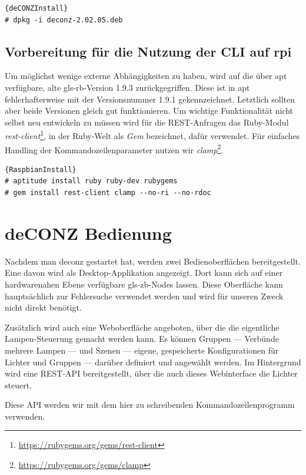\documentclass[a4paper,12pt]{article}
\begin{document}
\begin{lstlisting}[caption=deCONZ installieren]{deCONZInstall}
# dpkg -i deconz-2.02.05.deb
\end{lstlisting}

\subsection{Vorbereitung für die Nutzung der CLI auf \gls{rpi}}

Um möglichst wenige externe Abhängigkeiten zu haben, wird auf die über \gls{apt}
verfügbare, alte \gls{gls-rb}-Version 1.9.3 zurückgegriffen. Diese ist in \gls{apt}
fehlerhafterweise mit der Versionsnummer 1.9.1 gekennzeichnet. Letztlich sollten
aber beide Versionen gleich gut funktionieren.
Um wichtige Funktionalität nicht selbst neu entwickeln zu müssen wird für die
REST-Anfragen das Ruby-Modul
\emph{rest-client}\footnote{\url{https://rubygems.org/gems/rest-client}}, in der
Ruby-Welt als \emph{Gem} bezeichnet, dafür verwendet. Für einfaches Handling der
Kommandozeilenparameter nutzen wir
\emph{clamp}\footnote{\url{https://rubygems.org/gems/clamp}}.

\begin{lstlisting}[caption=Ruby und Ruby-Modulmanager installieren]{RaspbianInstall}
# aptitude install ruby ruby-dev rubygems
# gem install rest-client clamp --no-ri --no-rdoc
\end{lstlisting}

\section{deCONZ Bedienung}
\label{deconz}

Nachdem man \acrshort{deconz} gestartet hat, werden zwei Bedienoberflächen bereitgestellt.
Eine davon wird als Desktop-Applikation angezeigt. Dort kann sich auf einer hardwarenahen
Ebene verfügbare \gls{gls-zb}-Nodes lassen. Diese Oberfläche kann hauptsächlich zur
Fehlersuche verwendet werden und wird für unseren Zweck nicht direkt benötigt.

Zusätzlich wird auch eine Weboberfläche angeboten, über die die eigentliche Lampen-Steuerung
gemacht werden kann. Es können Gruppen --- Verbünde mehrere Lampen --- und Szenen
--- eigene, gespeicherte Konfigurationen für Lichter und Gruppen --- darüber definiert und
angewählt werden. Im Hintergrund wird eine REST-API bereitgestellt, über die auch dieses
Webinterface die Lichter steuert.

\noindent
Diese API werden wir mit dem hier zu schreibenden Kommandozeilenprogramm verwenden.
\end{document}
